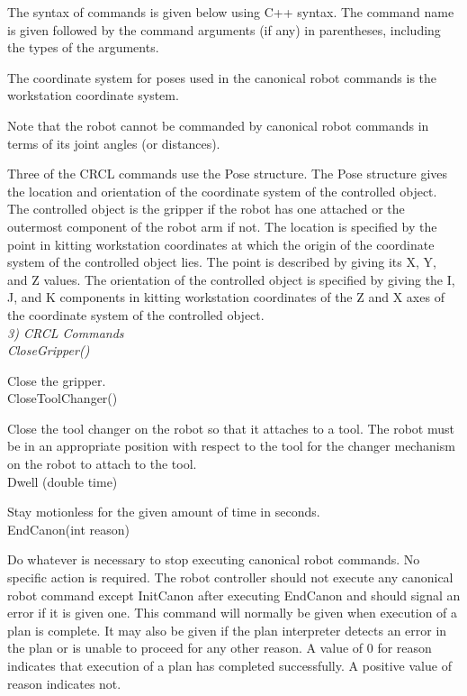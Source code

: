 The syntax of commands is given below using C++ syntax. The command
name is given followed by the command arguments (if any) in parentheses,
including the types of the arguments.

The coordinate system for poses used in the canonical robot commands is
the workstation coordinate system.

Note that the robot cannot be commanded by canonical robot commands in
terms of its joint angles (or distances).

Three of the CRCL commands use the Pose structure. The Pose structure gives
the location and orientation of the coordinate system of the controlled
object. The controlled object is the gripper if the robot has one attached
or the outermost component of the robot arm if not.  The location is
specified by the point in kitting workstation coordinates at which the
origin of the coordinate system of the controlled object lies. The point is
described by giving its X, Y, and Z values. The orientation of the
controlled object is specified by giving the I, J, and K components in
kitting workstation coordinates of the Z and X axes of the coordinate
system of the controlled object. \\

\it 3) CRCL Commands\rm \\

\sf CloseGripper()\rm

Close the gripper.\\

\sf CloseToolChanger()\rm

Close the tool changer on the robot so that it attaches to a tool. The
robot must be in an appropriate position with respect to the tool for
the changer mechanism on the robot to attach to the tool.\\

\sf Dwell (double time)\rm

Stay motionless for the given amount of time in seconds.\\

\sf EndCanon(int reason)\rm

Do whatever is necessary to stop executing canonical robot
commands. No specific action is required. The robot controller should
not execute any canonical robot command except \sf InitCanon \rm after
executing \sf EndCanon \rm and should signal an error if it is given one.
This command will normally be given when execution of a plan is complete.
It may also be given if the plan interpreter detects an error in the
plan or is unable to proceed for any other reason. A value of 0 for
reason indicates that execution of a plan has completed successfully.
A positive value of reason indicates not.\\

